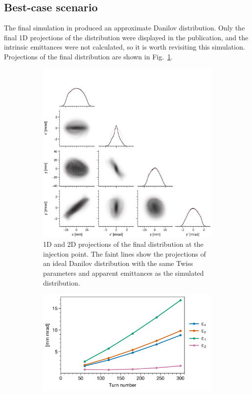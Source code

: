 \subsection{Best-case scenario}

The final simulation in \cite{Holmes2018} produced an approximate Danilov distribution. Only the final 1D projections of the distribution were displayed in the publication, and the intrinsic emittances were not calculated, so it is worth revisiting this simulation. Projections of the final distribution are shown in Fig.~\ref{fig:Holmes_corner_compare}.
%
\begin{figure}[!p]
    \centering
    \begin{subfigure}{0.8\textwidth}
        \includegraphics[width=\textwidth]{Images/chapter3/Holmes_corner_compare.png}
        \caption{1D and 2D projections of the final distribution at the injection point. The faint lines show the projections of an ideal Danilov distribution with the same Twiss parameters and apparent emittances as the simulated distribution.}
        \label{fig:Holmes_corner_compare}
    \end{subfigure}
    \vfill
    \vspace*{1.25cm}
    \vfill
    \begin{subfigure}{0.5\textwidth}
        \includegraphics[width=\textwidth]{Images/chapter3/Holmes_emittances.png}

\end{subfigure}
\end{figure}
